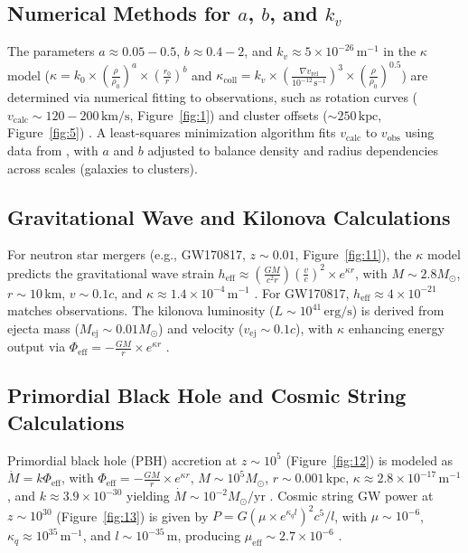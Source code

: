 \documentclass[a4paper,12pt]{article}
\begin{document}
\subsection{Numerical Methods for \texorpdfstring{$a$, $b$, and $k_v$}{a, b, and kv}}
The parameters $a \approx 0.05-0.5$, $b \approx 0.4-2$, and $k_v \approx 5 \times 10^{-26} \, \text{m}^{-1}$ in the $\kappa$ model ($\kappa = k_0 \times \left( \frac{\rho}{\rho_0} \right)^a \times \left( \frac{r_0}{r} \right)^b$ and $\kappa_{\mathrm{coll}} = k_v \times \left( \frac{\nabla v_{\mathrm{rel}}}{10^{-12} \, \text{s}^{-1}} \right)^3 \times \left( \frac{\rho}{\rho_0} \right)^{0.5}$) are determined via numerical fitting to observations, such as rotation curves ($v_\text{calc} \sim 120-200 \, \text{km/s}$, Figure~\ref{fig:1}) and cluster offsets ($\sim 250 \, \text{kpc}$, Figure~\ref{fig:5}) \citep{Carnall2024,Clowe2006}. A least-squares minimization algorithm fits $v_\text{calc}$ to $v_\text{obs}$ using data from \citep{Carnall2024}, with $a$ and $b$ adjusted to balance density and radius dependencies across scales (galaxies to clusters).

\subsection{Gravitational Wave and Kilonova Calculations}
For neutron star mergers (e.g., GW170817, $z \sim 0.01$, Figure~\ref{fig:11}), the $\kappa$ model predicts the gravitational wave strain $h_{\mathrm{eff}} \approx \left( \frac{G M}{c^2 r} \right) \left( \frac{v}{c} \right)^2 \times e^{\kappa r}$, with $M \sim 2.8 M_\odot$, $r \sim 10 \, \text{km}$, $v \sim 0.1 c$, and $\kappa \approx 1.4 \times 10^{-4} \, \text{m}^{-1}$ \citep{LIGO2017}. For GW170817, $h_{\mathrm{eff}} \approx 4 \times 10^{-21}$ matches observations. The kilonova luminosity ($L \sim 10^{41} \, \text{erg/s}$) is derived from ejecta mass ($M_{\mathrm{ej}} \sim 0.01 M_\odot$) and velocity ($v_{\mathrm{ej}} \sim 0.1 c$), with $\kappa$ enhancing energy output via $\Phi_{\mathrm{eff}} = -\frac{G M}{r} \times e^{\kappa r}$ \citep{Metzger2017}.

\subsection{Primordial Black Hole and Cosmic String Calculations}
Primordial black hole (PBH) accretion at $z \sim 10^5$ (Figure~\ref{fig:12}) is modeled as $\dot{M} = k \Phi_{\mathrm{eff}}$, with $\Phi_{\mathrm{eff}} = -\frac{G M}{r} \times e^{\kappa r}$, $M \sim 10^5 M_\odot$, $r \sim 0.001 \, \text{kpc}$, $\kappa \approx 2.8 \times 10^{-17} \, \text{m}^{-1}$, and $k \approx 3.9 \times 10^{-30}$ yielding $\dot{M} \sim 10^{-2} M_\odot/\text{yr}$ \citep{Carr2020}. Cosmic string GW power at $z \sim 10^{30}$ (Figure~\ref{fig:13}) is given by $P = G \left( \mu \times e^{\kappa_q l} \right)^2 c^5 / l$, with $\mu \sim 10^{-6}$, $\kappa_q \approx 10^{35} \, \text{m}^{-1}$, and $l \sim 10^{-35} \, \text{m}$, producing $\mu_{\mathrm{eff}} \sim 2.7 \times 10^{-6}$ \citep{Carr2020}.
\end{document}

